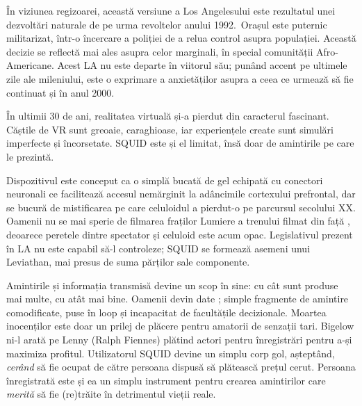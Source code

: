 \documentclass[12pt]{article}
\begin{document}
În viziunea regizoarei, această versiune a Los Angelesului este rezultatul unei dezvoltări naturale de pe urma revoltelor anului 1992. Orașul este puternic militarizat, într-o încercare a poliției de a relua control asupra populației. Această decizie se reflectă mai ales asupra celor marginali, în special comunității Afro-Americane. Acest LA nu este departe în viitorul său; punând accent pe ultimele zile ale mileniului, este o exprimare a anxietăților asupra a ceea ce urmează să fie continuat și în anul 2000.\par

În ultimii 30 de ani, realitatea virtuală și-a pierdut din caracterul fascinant. Căștile de VR sunt greoaie, caraghioase, iar experiențele create sunt simulări imperfecte și încorsetate. SQUID este și el limitat, însă doar de amintirile pe care le prezintă.\par

Dispozitivul este conceput ca o simplă bucată de gel echipată cu conectori neuronali ce facilitează accesul nemărginit la adâncimile cortexului prefrontal, dar se bucură de mistificarea pe care celuloidul a pierdut-o pe parcursul secolului XX. Oamenii nu se mai sperie de filmarea fraților Lumiere a trenului filmat din față \cite{Willistein1995a}, deoarece peretele dintre spectator și celuloid este acum opac. Legislativul prezent în LA nu este capabil să-l controleze; SQUID se formează asemeni unui Leviathan, mai presus de suma părților sale componente.\par

Amintirile și informația transmisă devine un scop în sine: cu cât sunt produse mai multe, cu atât mai bine. Oamenii devin date \cite{Vishnevetsky2012a}; simple fragmente de amintire comodificate, puse în loop și incapacitat de facultățile decizionale. Moartea inocenților este doar un prilej de plăcere pentru amatorii de senzații tari. Bigelow ni-l arată pe Lenny (Ralph Fiennes) plătind actori pentru înregistrări pentru a-și maximiza profitul. Utilizatorul SQUID devine un simplu corp gol, așteptând, \textit{cerând} să fie ocupat de către persoana dispusă să plătească prețul cerut. Persoana înregistrată este și ea un simplu instrument pentru crearea amintirilor care \textit{merită} să fie (re)trăite în detrimentul vieții reale.\par
\end{document}
